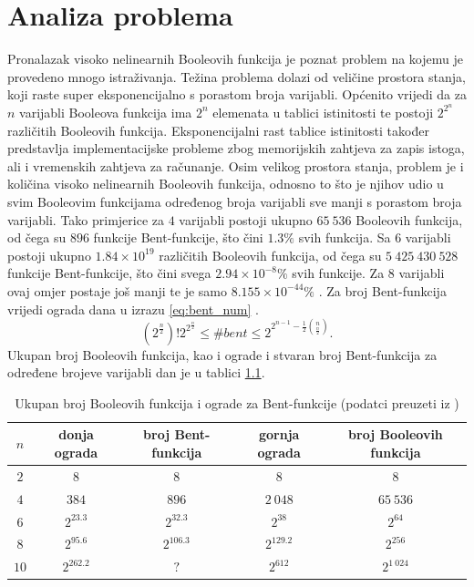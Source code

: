\chapter{Analiza problema}
Pronalazak visoko nelinearnih Booleovih funkcija je poznat problem na kojemu je provedeno mnogo istraživanja.
Težina problema dolazi od veličine prostora stanja, koji raste super eksponencijalno s porastom broja varijabli.
Općenito vrijedi da za $n$ varijabli Booleova funkcija ima $2^n$ elemenata u tablici istinitosti te postoji $2^{2^n}$ različitih Booleovih funkcija.
Eksponencijalni rast tablice istinitosti također predstavlja implementacijske probleme zbog memorijskih zahtjeva za zapis istoga, ali i vremenskih zahtjeva za računanje.
Osim velikog prostora stanja, problem je i količina visoko nelinearnih Booleovih funkcija, odnosno to što je njihov udio u svim Booleovim funkcijama određenog broja varijabli sve manji s porastom broja varijabli.
Tako primjerice za $4$ varijabli postoji ukupno $65\:536$ Booleovih funkcija, od čega su $896$ funkcije Bent-funkcije, što čini $1.3\%$ svih funkcija.
Sa $6$ varijabli postoji ukupno $1.84 \times 10^{19}$ različitih Booleovih funkcija, od čega su $5\:425\:430\:528$ funkcije Bent-funkcije, što čini svega $2.94 \times 10^{-8}\%$ svih funkcije.
Za $8$ varijabli ovaj omjer postaje još manji te je samo $8.155 \times 10^{-44}\%$ \cite{DiscoveryOfBent}.
Za broj Bent-funkcija vrijedi ograda dana u izrazu \eqref{eq:bent_num} \cite{CryptographicBooleanFunctions}.
\begin{equation}\label{eq:bent_num}
    \left(2^{\frac{n}{2}}\right)! 2^{2^{\frac{n}{2}}} \leq
    \#bent \leq
    2^{2^{n-1}-\frac{1}{2}\binom{n}{\frac{n}{2}}}.
\end{equation}
Ukupan broj Booleovih funkcija, kao i ograde i stvaran broj Bent-funkcija za određene brojeve varijabli dan je u tablici \ref{tbl:boolean_count}.
\begin{table}[]
\caption{Ukupan broj Booleovih funkcija i ograde za Bent-funkcije (podatci preuzeti iz \cite{CryptographicBooleanFunctions})}
\begin{tabular}{c|cccc}
$n$ & donja ograda & broj Bent-funkcija & gornja ograda & broj Booleovih funkcija \\ \hline
$2$ & $8$ & $8$ & $8$ & $8$ \\
$4$ & $384$ & $896$ & $2\:048$ & $65\:536$ \\
$6$ & $2^{23.3}$ & $2^{32.3}$ & $2^{38}$ & $2^{64}$ \\
$8$ & $2^{95.6}$ & $2^{106.3}$ & $2^{129.2}$ & $2^{256}$ \\
$10$ & $2^{262.2}$ & $?$ & $2^{612}$ & $2^{1\:024}$
\end{tabular}
\label{tbl:boolean_count}
\end{table}

